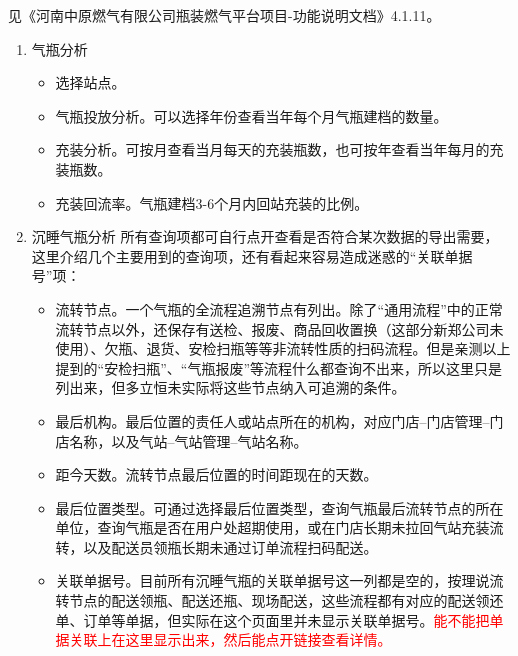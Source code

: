 \documentclass[UTF8]{ctexart}
\begin{document}
见《河南中原燃气有限公司瓶装燃气平台项目-功能说明文档》4.1.11。

\begin{enumerate}
	\item 气瓶分析
	
	\begin{itemize}
		
		\item 选择站点。
		
		\item 气瓶投放分析。可以选择年份查看当年每个月气瓶建档的数量。
		
		\item 充装分析。可按月查看当月每天的充装瓶数，也可按年查看当年每月的充装瓶数。
		
		\item 充装回流率。气瓶建档3-6个月内回站充装的比例。
		
	\end{itemize}

	\item 沉睡气瓶分析
	所有查询项都可自行点开查看是否符合某次数据的导出需要，这里介绍几个主要用到的查询项，还有看起来容易造成迷惑的“关联单据号”项：
	\begin{itemize}
		
		\item 流转节点。一个气瓶的全流程追溯节点有列出。除了“通用流程”中的正常流转节点以外，还保存有送检、报废、商品回收置换（这部分新郑公司未使用）、欠瓶、退货、安检扫瓶等等非流转性质的扫码流程。但是亲测以上提到的“安检扫瓶”、“气瓶报废”等流程什么都查询不出来，所以这里只是列出来，但多立恒未实际将这些节点纳入可追溯的条件。
				
		\item 最后机构。最后位置的责任人或站点所在的机构，对应门店--门店管理--门店名称，以及气站--气站管理--气站名称。
		
		\item 距今天数。流转节点最后位置的时间距现在的天数。
		
		\item 最后位置类型。可通过选择最后位置类型，查询气瓶最后流转节点的所在单位，查询气瓶是否在用户处超期使用，或在门店长期未拉回气站充装流转，以及配送员领瓶长期未通过订单流程扫码配送。
		
		\item 关联单据号。目前所有沉睡气瓶的关联单据号这一列都是空的，按理说流转节点的配送领瓶、配送还瓶、现场配送，这些流程都有对应的配送领还单、订单等单据，但实际在这个页面里并未显示关联单据号。\textcolor{red}{能不能把单据关联上在这里显示出来，然后能点开链接查看详情。}
		

\end{itemize}
\end{enumerate}
\end{document}
